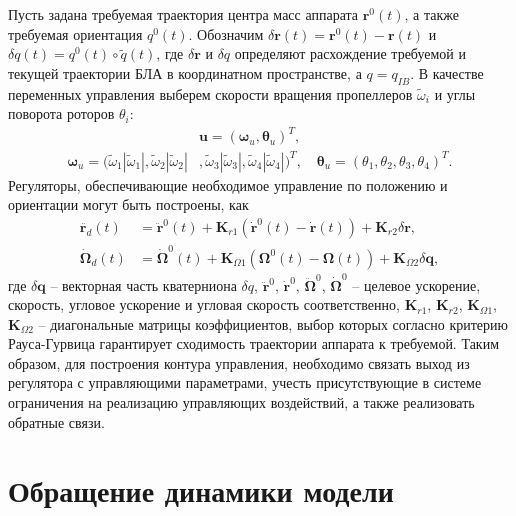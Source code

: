 Пусть задана требуемая траектория центра масс аппарата $\bm r^0(t)$, а также требуемая ориентация $q^0(t)$. Обозначим  $\delta \bm r(t) = \bm r^0(t) - \bm r(t)$ и $\delta q(t) = q^0(t) \circ \tilde q(t)$, где $\delta \bm r$ и $\delta q$ определяют расхождение требуемой и текущей траектории БЛА в координатном пространстве, а $q = q_{IB}$.  В качестве переменных управления выберем скорости вращения пропеллеров ${\tilde \omega}_i$ и углы поворота роторов ${\theta}_i$:
\begin{equation} \label{eq:m_ctrl_out}
\begin{aligned}
	&\bm{u} = (\bm \omega_u, \bm \theta_u)^T,
	\\
	\bm \omega_u =
	(\tilde\omega_1 |\tilde\omega_1|,
	\tilde\omega_2 |\tilde\omega_2|&,
	\tilde\omega_3 |\tilde\omega_3|,
	\tilde\omega_4 |\tilde\omega_4|)^T,
	\quad
	\bm \theta_u = (\theta_1, \theta_2 , \theta_3 , \theta_4 )^T.
\end{aligned}
\end{equation}
Регуляторы, обеспечивающие необходимое управление по положению и ориентации могут быть построены, как
\begin{equation} \label{eq:m_reg}
\begin{aligned}
	\ddot{\bm{r}_d}(t)&=
	\ddot{\bm{r}}^0(t)+\bm{K}_{r1}(\dot{\bm{r}}^0(t) - \dot{\bm{r}}(t))+\bm{K}_{r2}\delta \bm r,\\
	\dot{\bm{\Omega}}_d(t)&=
	\dot{\bm{\Omega}}^0(t)+\bm{K}_{\Omega1}(\bm{\Omega}^0(t)-\bm{\Omega}(t))+\bm{K}_{\Omega2}\delta\bm{q},
\end{aligned}
\end{equation}
где $\delta \bm q$ -- векторная часть кватерниона $\delta q$,
$\ddot{\bm{r}}^0$, $\dot{\bm{r}}^0$, $\ddot{\bm{\Omega}}^0$, $\dot{\bm{\Omega}}^0$ -- целевое ускорение, скорость, угловое ускорение и угловая скорость соответственно,
$\bm K_{r1}$, $\bm K_{r2}$, $\bm K_{\Omega1}$, $\bm K_{\Omega2}$ -- диагональные матрицы коэффициентов, выбор которых согласно критерию Рауса-Гурвица гарантирует сходимость траектории аппарата к требуемой. Таким образом, для построения
контура управления, необходимо связать выход из регулятора с управляющими
параметрами, учесть присутствующие в системе ограничения на реализацию
управляющих воздействий, а также реализовать обратные связи.

\section{Обращение динамики модели}
\label{section_dyn_inverse}

